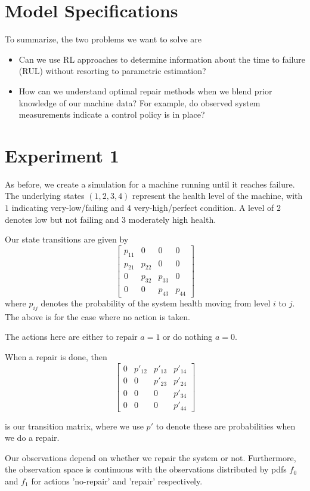 \documentclass[english]{article}
\numberwithin{equation}{section}
\begin{document}
\section*{Model Specifications}

To summarize, the two problems we want to solve are
\begin{itemize}
	\item Can we use RL approaches to determine information about the time to failure (RUL) without resorting to parametric estimation?
	\item How can we understand optimal repair methods when we blend prior knowledge of our machine data? For example, do observed system measurements indicate a control policy is in place?
\end{itemize}
\section*{Experiment 1}
As before, we create a simulation for a machine running until it reaches failure. The underlying states $(1,2,3,4)$ represent the health level of the machine, with $1$ indicating very-low/failing and $4$ very-high/perfect condition. A level of $2$ denotes low but not failing and $3$ moderately high health.

Our state transitions are given by 
$$
\begin{bmatrix}
	p_{11} & 0 & 0 & 0 \\
	p_{21} & p_{22} & 0 & 0 \\
	0 & p_{32} & p_{33} & 0 \\
	0 & 0 & p_{43} & p_{44}
\end{bmatrix}
$$
where $p_{ij}$ denotes the probability of the system health moving from level $i$ to $j$. The above is for the case where no action is taken.

The actions here are either to repair $a=1$ or do nothing $a=0$.

When a repair is done, then
$$
\begin{bmatrix}
    0 & p'_{12} & p'_{13} & p'_{14} \\
	0 & 0 & p'_{23} & p'_{24} \\
	0 & 0 & 0 & p'_{34} \\
	0 & 0 & 0 & p'_{44}
\end{bmatrix}
$$

is our transition matrix, where we use $p'$ to denote these are probabilities when we do a repair.

Our observations depend on whether we repair the system or not. Furthermore, the observation space is continuous with the observations distributed by pdfs $f_0$ and $f_1$ for actions 'no-repair' and 'repair' respectively.
\end{document}
